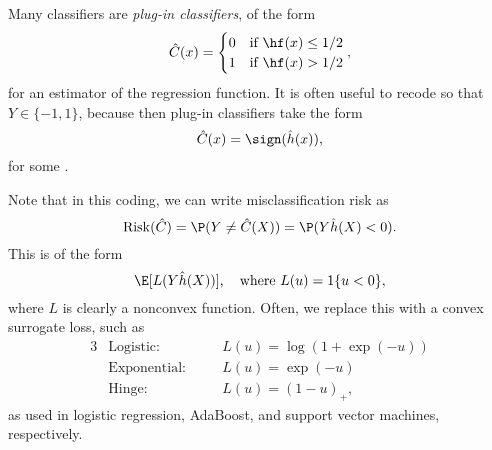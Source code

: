 \documentclass{article}
\begin{document}
Many classifiers are \emph{plug-in classifiers}, of the form 
\[
\hC(x) = 
\begin{cases}
0 & \text{if $\hf(x) \leq 1/2$} \\
1 & \text{if $\hf(x) > 1/2$}
\end{cases},
\]
for an estimator \smash{$\hf$} of the regression function. It is often useful to 
recode so that $Y \in \{-1,1\}$, because then plug-in classifiers take the form  
\[
\hC(x) = \sign(\hh(x)),
\]
for some \smash{$\hh$}. 

Note that in this coding, we can write misclassification risk as 
\[
\Risk(\hC) = \P(Y \not= \hC(X)) = \P( Y \hh(X) < 0).
\]
This is of the form 
\[
\E[L(Y \hh(X))], \quad \text{where $L(u) = 1\{u < 0\}$},
\]
where $L$ is clearly a nonconvex function. Often, we replace this with a convex
surrogate loss, such as 
\begin{alignat*}{3}
&\text{Logistic}: \quad 
&& L(u) = \log(1 + \exp(-u)) \\
&\text{Exponential}: \quad 
&&L(u) = \exp(-u) \\
&\text{Hinge}: \quad 
&&L(u) = (1 - u)_+,
\end{alignat*}
as used in logistic regression, AdaBoost, and support vector machines,
respectively. 



\end{document}
